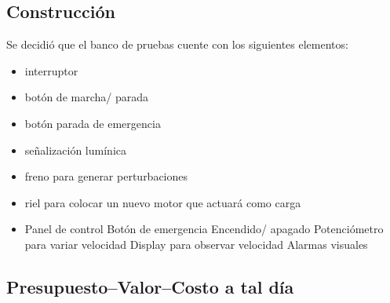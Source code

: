 
\subsection{Construcción}
Se decidió que el banco de pruebas cuente con los siguientes elementos:
\begin{itemize}
	\item interruptor
	\item botón de marcha/ parada
	\item botón parada de emergencia
	\item señalización lumínica
	\item freno para generar perturbaciones
	\item riel para colocar un nuevo motor que actuará como carga
	\item Panel de control
	      \subitem Botón de emergencia
	      \subitem Encendido/ apagado
	      \subitem Potenciómetro para variar velocidad
	      \subitem Display para observar velocidad
	      \subitem Alarmas visuales
\end{itemize}
\subsection{Presupuesto--Valor--Costo a tal día}


\newpage